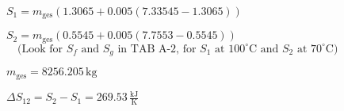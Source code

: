 \( S_1 = m_{\text{ges}} (1.3065 + 0.005 (7.33545 - 1.3065)) \)  

\( S_2 = m_{\text{ges}} (0.5545 + 0.005 (7.7553 - 0.5545)) \)  
\( \quad \text{(Look for } S_f \text{ and } S_g \text{ in TAB A-2, for } S_1 \text{ at } 100^\circ \text{C} \text{ and } S_2 \text{ at } 70^\circ \text{C}) \)  

\( m_{\text{ges}} = 8256.205 \, \text{kg} \)  

\( \Delta S_{12} = S_2 - S_1 = 269.53 \, \frac{\text{kJ}}{\text{K}} \)